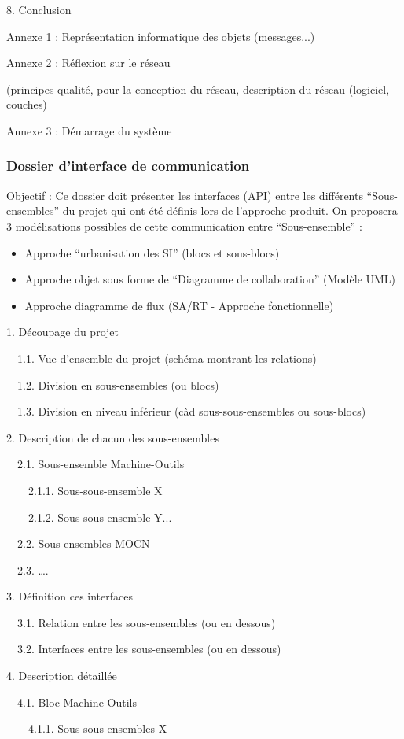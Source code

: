 \documentclass{mise_en_page}
\begin{document}
8. Conclusion

Annexe 1 : Représentation informatique des objets (messages...)

Annexe 2 : Réflexion sur le réseau

(principes qualité, pour la conception du réseau, description du réseau
(logiciel, couches)

Annexe 3 : Démarrage du système

\subsubsection{Dossier d’interface de communication}
Objectif : Ce dossier doit présenter les interfaces (API) entre les
différents “Sous-ensembles” du projet qui ont été définis lors de
l’approche produit. On proposera 3 modélisations possibles de cette
communication entre “Sous-ensemble” :

\begin{itemize}
\item Approche “urbanisation des SI” (blocs et sous-blocs)
\item Approche objet sous forme de “Diagramme de collaboration” (Modèle
UML)
\item Approche diagramme de flux (SA/RT - Approche fonctionnelle)
\end{itemize}
1. Découpage du projet

\ \ 1.1. Vue d’ensemble du projet (schéma montrant les relations)

\ \ 1.2. Division en sous-ensembles (ou blocs)

\ \ 1.3. Division en niveau inférieur (càd sous-sous-ensembles ou
sous-blocs)

2. Description de chacun des sous-ensembles

\ \ 2.1. Sous-ensemble Machine-Outils

\ \ \ \ 2.1.1. Sous-sous-ensemble X

\ \ \ \ 2.1.2. Sous-sous-ensemble Y...

\ \ 2.2. Sous-ensembles MOCN

\ \ 2.3. ….

3. Définition ces interfaces

\ \ 3.1. Relation entre les sous-ensembles (ou en dessous)

\ \ 3.2. Interfaces entre les sous-ensembles (ou en dessous)

4. Description détaillée

\ \ 4.1. Bloc Machine-Outils

\ \ \ \ 4.1.1. Sous-sous-ensembles X
\end{document}
